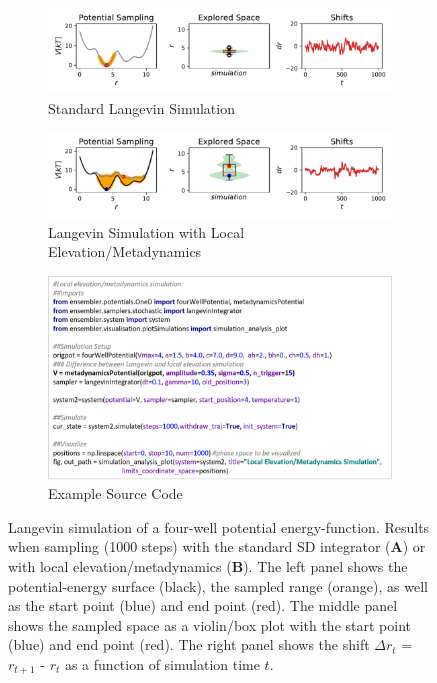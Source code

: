 \begin{figure}[h]
	\centering
	\begin{subfigure}{\textwidth}
		\caption{Standard Langevin Simulation}
		\centering
		\includegraphics[width=0.85\linewidth]{fig/codeExamples/langevin_simulation.pdf} 
	\end{subfigure}
	\vspace{2.5mm}
	\begin{subfigure}{\textwidth}
		\caption{Langevin Simulation with Local Elevation/Metadynamics}
		\centering
		\includegraphics[width=0.85\linewidth]{fig/codeExamples/metaDynamics_simulation.pdf}
	\end{subfigure}
	\vspace{2.5mm}
	\begin{subfigure}{\textwidth}
		\caption{Example Source Code}
		\centering
		\includegraphics[width=0.85\linewidth]{fig/codeExamples/Simulation_code.png}
	\end{subfigure}
\caption{Langevin simulation of a four-well potential energy-function. Results when sampling (1000 steps) with the standard SD integrator (\textbf{A}) or with local elevation\cite{Huber1994}/metadynamics\cite{Laio2002} (\textbf{B}). The left panel shows the potential-energy surface (black), the sampled range (orange), as well as the start point (blue) and end point (red). The middle panel shows the sampled space as a violin/box plot with the start point (blue) and end point (red). The right panel shows the shift $\Delta r_t$ = $r_{t+1}$ - $r_t$ as a function of simulation time $t$.
}
\end{figure}
